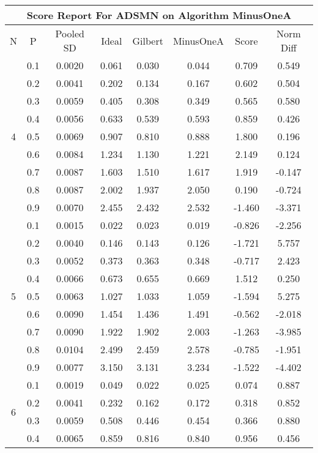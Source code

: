 \documentclass[11pt,a4paper]{report}
\begin{document}
\begin{longtable}{ | c | c || c | c | c | c | c | c | }
\hline
\multicolumn{8}{|c|}{ Score Report For ADSMN on Algorithm MinusOneA} \\
\hline
N & P & Pooled SD &  Ideal &  Gilbert & MinusOneA  & Score & Norm Diff \\
 \hline
 \hline
 \endhead
\multirow{9}{*}{4} & 0.1 & 0.0020 & 0.061 & 0.030 & 0.044 & 0.709 & 0.549 \\
 & 0.2 & 0.0041 & 0.202 & 0.134 & 0.167 & 0.602 & 0.504 \\
 & 0.3 & 0.0059 & 0.405 & 0.308 & 0.349 & 0.565 & 0.580 \\
 & 0.4 & 0.0056 & 0.633 & 0.539 & 0.593 & 0.859 & 0.426 \\
 & 0.5 & 0.0069 & 0.907 & 0.810 & 0.888 & 1.800 & 0.196 \\
 & 0.6 & 0.0084 & 1.234 & 1.130 & 1.221 & 2.149 & 0.124 \\
 & 0.7 & 0.0087 & 1.603 & 1.510 & 1.617 & 1.919 & -0.147 \\
 & 0.8 & 0.0087 & 2.002 & 1.937 & 2.050 & 0.190 & -0.724 \\
 & 0.9 & 0.0070 & 2.455 & 2.432 & 2.532 & -1.460 & -3.371 \\
 \hline
\multirow{9}{*}{5} & 0.1 & 0.0015 & 0.022 & 0.023 & 0.019 & -0.826 & -2.256 \\
 & 0.2 & 0.0040 & 0.146 & 0.143 & 0.126 & -1.721 & 5.757 \\
 & 0.3 & 0.0052 & 0.373 & 0.363 & 0.348 & -0.717 & 2.423 \\
 & 0.4 & 0.0066 & 0.673 & 0.655 & 0.669 & 1.512 & 0.250 \\
 & 0.5 & 0.0063 & 1.027 & 1.033 & 1.059 & -1.594 & 5.275 \\
 & 0.6 & 0.0090 & 1.454 & 1.436 & 1.491 & -0.562 & -2.018 \\
 & 0.7 & 0.0090 & 1.922 & 1.902 & 2.003 & -1.263 & -3.985 \\
 & 0.8 & 0.0104 & 2.499 & 2.459 & 2.578 & -0.785 & -1.951 \\
 & 0.9 & 0.0077 & 3.150 & 3.131 & 3.234 & -1.522 & -4.402 \\
 \hline
\multirow{9}{*}{6} & 0.1 & 0.0019 & 0.049 & 0.022 & 0.025 & 0.074 & 0.887 \\
 & 0.2 & 0.0041 & 0.232 & 0.162 & 0.172 & 0.318 & 0.852 \\
 & 0.3 & 0.0059 & 0.508 & 0.446 & 0.454 & 0.366 & 0.880 \\
 & 0.4 & 0.0065 & 0.859 & 0.816 & 0.840 & 0.956 & 0.456 \\

\end{longtable}
\end{document}

